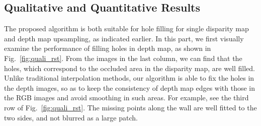\subsection{Qualitative and Quantitative Results}
The proposed algorithm is both suitable for hole filling for single disparity map and depth map upsampling, as indicated earlier. In this part, we first visually examine the performance of filling holes in depth map, as shown in Fig.~\ref{fig:quali_rst}. From the images in the last column, we can find that the holes, which correspond to the occluded area in the disparity map, are well filled. Unlike traditional interpolation methods, our algorithm is able to fix the holes in the depth images, so as to keep the consistency of depth map edges with those in the RGB images and avoid smoothing in such areas. For example, see the third row of Fig.~\ref{fig:quali_rst}. The missing points along the wall are well fitted to the two sides, and not blurred as a large patch.
